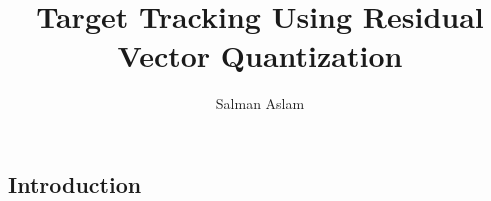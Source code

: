 \documentclass[12pt,letterpaper,doublespaced,ETD]{gt-ece-thesis} %
\title{Target Tracking Using Residual Vector Quantization}
\author{Salman Aslam}
\begin{document}
\begin{FrontMatter}
\contents %
\end{FrontMatter}





\begin{Body}	
\chapter{Introduction}







\end{Body}

\begin{EndMatter}
\end{EndMatter}
\end{document}
